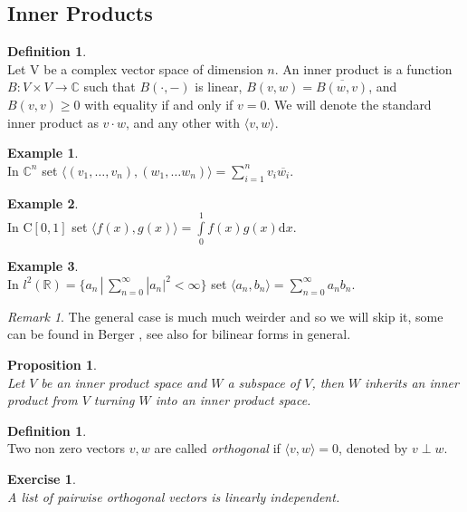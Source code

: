 \documentclass[12pt]{article}
\newcommand{\double}{\hspace{2pt}}
\newtheorem{prop}[theorem]{Proposition}
\theoremstyle{definition}
\newtheorem{definition}[theorem]{Definition}
\newtheorem*{example}{Example}
\theoremstyle{remark}
\newtheorem*{remark}{Remark}
\theoremstyle{plain}
\newtheorem{ex}[subsubsection]{Exercise}
\begin{document}
\subsection{Inner Products}
\begin{definition}\leavevmode \\
    Let V be a complex vector space of dimension  $n$. An inner product is a  function $B:V\times V \to \mathbb{C}$ such that $B(\cdot,-)$ is linear, $B(v,w)=\overline{B(w,v)}$, and $B(v,v)\geq 0$ with equality if and only if $v=0$. We will denote the standard inner product as $ v\cdot w$, and any other with $  \langle v,w\rangle$.
\end{definition}
\begin{example}\leavevmode \\
    In $\mathbb{C}^n$ set $\langle (v_1,\ldots ,v_n),(w_1,\dots w_n)\rangle=\sum\limits_{i=1}^nv_i\overline{w_i}$.
\end{example}
\begin{example}\leavevmode \\
    In $\mathrm{C}[0,1]$ set $\langle f(x),g(x)\rangle=\int\limits_0^1 f(x)g(x) \mathrm{d}x$.
\end{example}
\begin{example}\leavevmode \\
    In $l^2(\mathbb{R})=\{ a_n \double | \double \sum\limits_{n=0}^\infty |a_n|^2 <\infty \}$ set $\langle a_n,b_n\rangle=\sum \limits_{n=0}^\infty a_nb_n$.
\end{example}
\begin{remark}
    The general case is much much weirder and so we will skip it, some can be found in Berger \cite{Berger1,Berger2}, see also \cite{Kaplansky} for bilinear forms in general.
\end{remark}
\begin{prop}\leavevmode \\
    Let $V$ be an inner product space and $W$ a subspace of $V$, then $W$ inherits an inner product from $V$ turning $W$ into an inner product space.
\end{prop}
\begin{definition}\leavevmode \\
Two non zero vectors $v,w$ are called \textit{orthogonal} if $\langle v,w\rangle=0$, denoted by $v\perp w$.
\end{definition}
\begin{ex}\leavevmode \\
    A list of pairwise orthogonal vectors is linearly independent.
\end{ex}
\end{document}
